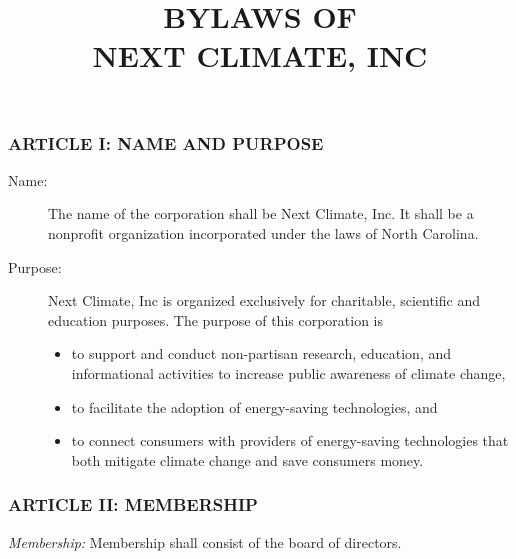 \documentclass[12pt]{article}
\begin{document}
\renewcommand{\descriptionlabel}[1]{\hspace{\labelsep}\emph{#1}}

\title{BYLAWS OF \\ NEXT CLIMATE, INC}
\date{}
\maketitle

\noindent
\subsubsection*{ARTICLE I: NAME AND PURPOSE}
\begin{description}
\item[Name:] The name of the corporation shall be Next Climate, Inc. It shall be a
nonprofit organization incorporated under the laws of North Carolina.
\item[Purpose:] Next Climate, Inc is organized exclusively for charitable, scientific
and education purposes. The purpose of this corporation is
\begin{itemize}
\item to support and conduct non-partisan research, education, and
  informational activities to increase public awareness of climate
  change,
\item to facilitate the adoption of energy-saving technologies, and
\item to connect consumers with providers of energy-saving
  technologies that both mitigate climate change and save consumers
  money.
\end{itemize}

\end{description}
\subsubsection*{ARTICLE II: MEMBERSHIP}

\emph{Membership:} Membership shall consist of the board of directors.
\end{document}
